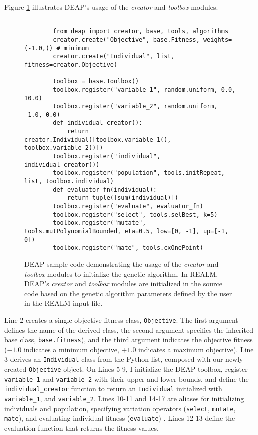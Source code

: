 Figure \ref{fig:deap-code} illustrates DEAP's usage of the \textit{creator} and
\textit{toolbox} modules. 
\begin{figure}[]
    \begin{verbatim}
        
        from deap import creator, base, tools, algorithms
        creator.create("Objective", base.Fitness, weights=(-1.0,)) # minimum
        creator.create("Individual", list, fitness=creator.Objective)

        toolbox = base.Toolbox()
        toolbox.register("variable_1", random.uniform, 0.0, 10.0)
        toolbox.register("variable_2", random.uniform, -1.0, 0.0)
        def individual_creator():
            return creator.Individual([toolbox.variable_1(), toolbox.variable_2()])
        toolbox.register("individual", individual_creator())
        toolbox.register("population", tools.initRepeat, list, toolbox.individual)
        def evaluator_fn(individual):
            return tuple([sum(individual)])
        toolbox.register("evaluate", evaluator_fn)
        toolbox.register("select", tools.selBest, k=5)
        toolbox.register("mutate", tools.mutPolynomialBounded, eta=0.5, low=[0, -1], up=[-1, 0])
        toolbox.register("mate", tools.cxOnePoint)
    \end{verbatim}
    \caption{DEAP sample code demonstrating the usage of the \textit{creator} and
    \textit{toolbox} modules to initialize the genetic algorithm. In REALM, DEAP's 
    \textit{creator} and \textit{toolbox} modules are initialized in the source 
    code based on the genetic algorithm parameters defined by the user in the 
    REALM input file. }
    \label{fig:deap-code}
\end{figure}
Line 2 creates a single-objective fitness class, \texttt{Objective}. 
The first argument defines the name of the derived class, the second argument 
specifies the inherited base class, \texttt{base.fitness}), and the third 
argument indicates the objective fitness ($-1.0$ indicates a minimum objective, 
$+1.0$ indicates a maximum objective). 
Line 3 derives an \texttt{Individual} class from the Python list,
composed with our newly created \texttt{Objective} object. 
On Lines 5-9, I initialize the \gls{DEAP} toolbox, register 
\texttt{variable\_1} and \texttt{variable\_2} with their upper and lower bounds, 
and define the \texttt{individual\_creator} function to return an 
\texttt{Individual} initialized with \texttt{variable\_1}, and \texttt{variable\_2}. 
Lines 10-11 and 14-17 are aliases for initializing individuals and population, 
specifying variation operators (\texttt{select}, \texttt{mutate}, \texttt{mate}), 
and evaluating individual fitness (\texttt{evaluate}) \cite{fortin_deap_2012}. 
Lines 12-13 define the evaluation function that returns the fitness values. 

